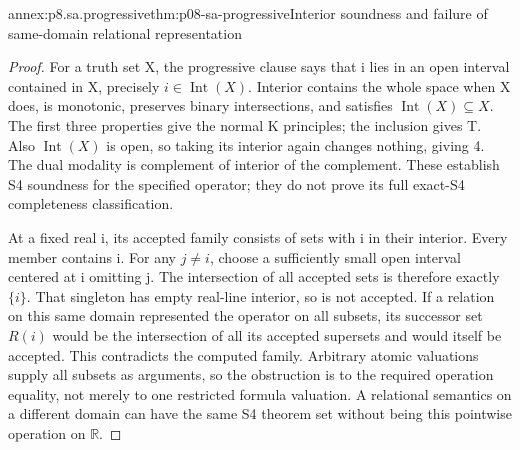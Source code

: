 \begin{annexitem}{annex:p8.sa.progressive}{thm:p08-sa-progressive}{Interior soundness and failure of same-domain relational representation}
\begin{proof}
For a truth set X, the progressive clause says that i lies in
an open interval contained in X, precisely \(i\in\operatorname{Int}(X)\).
Interior contains the whole space when X does, is monotonic,
preserves binary intersections, and satisfies
\(\operatorname{Int}(X)\subseteq X\).
The first three properties give the normal K principles;
the inclusion gives T. Also \(\operatorname{Int}(X)\) is
open, so taking its interior again changes nothing, giving 4.
The dual modality is complement of interior of the complement.
These establish S4 soundness for the specified operator; they
do not prove its full exact-S4 completeness classification.

At a fixed real i, its accepted family consists of sets with i
in their interior. Every member contains i. For any \(j\ne i\),
choose a sufficiently small open interval centered at i omitting
j. The intersection of all accepted sets is therefore exactly
\(\{i\}\). That singleton has empty real-line interior,
so is not accepted. If a relation on this same domain represented
the operator on all subsets, its successor set \(R(i)\)
would be the intersection of all its accepted supersets and
would itself be accepted. This contradicts the computed family.
Arbitrary atomic valuations supply all subsets as arguments, so
the obstruction is to the required operation equality, not merely
to one restricted formula valuation. A relational semantics on
a different domain can have the same S4 theorem set without
being this pointwise operation on \(\mathbb R\).
\end{proof}
\end{annexitem}

